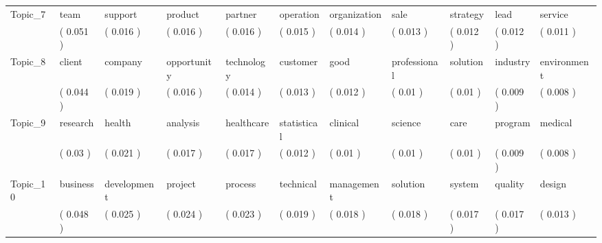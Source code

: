 \begin{tabular}{lllllllllll}
Topic\_7  &       team &      support &      product &     partner &    operation &   organization &          sale &   strategy &         lead &      service \\
         &  ( 0.051 ) &    ( 0.016 ) &    ( 0.016 ) &   ( 0.016 ) &    ( 0.015 ) &      ( 0.014 ) &     ( 0.013 ) &  ( 0.012 ) &    ( 0.012 ) &    ( 0.011 ) \\
Topic\_8  &     client &      company &  opportunity &  technology &     customer &           good &  professional &   solution &     industry &  environment \\
         &  ( 0.044 ) &    ( 0.019 ) &    ( 0.016 ) &   ( 0.014 ) &    ( 0.013 ) &      ( 0.012 ) &      ( 0.01 ) &   ( 0.01 ) &    ( 0.009 ) &    ( 0.008 ) \\
Topic\_9  &   research &       health &     analysis &  healthcare &  statistical &       clinical &       science &       care &      program &      medical \\
         &   ( 0.03 ) &    ( 0.021 ) &    ( 0.017 ) &   ( 0.017 ) &    ( 0.012 ) &       ( 0.01 ) &      ( 0.01 ) &   ( 0.01 ) &    ( 0.009 ) &    ( 0.008 ) \\
Topic\_10 &   business &  development &      project &     process &    technical &     management &      solution &     system &      quality &       design \\
         &  ( 0.048 ) &    ( 0.025 ) &    ( 0.024 ) &   ( 0.023 ) &    ( 0.019 ) &      ( 0.018 ) &     ( 0.018 ) &  ( 0.017 ) &    ( 0.017 ) &    ( 0.013 ) \\
\bottomrule
\end{tabular}
